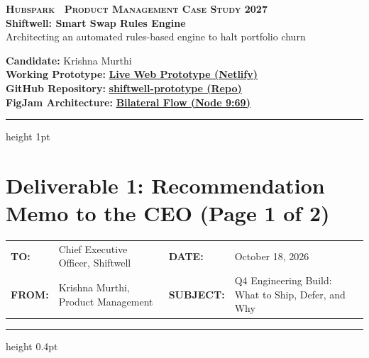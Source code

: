 \documentclass[10pt,a4paper]{article}
\begin{document}

\noindent
\begin{minipage}[t]{0.63\textwidth}
    {\scriptsize\bfseries\textsc{Hubspark \textbar\ Product Management Case Study 2027}}\\[1.5mm]
    {\LARGE\bfseries Shiftwell: Smart Swap Rules Engine}\\[1mm]
    {\small Architecting an automated rules-based engine to halt portfolio churn}
\end{minipage}
\hfill
\begin{minipage}[t]{0.35\textwidth}
    \raggedleft\footnotesize
    \textbf{Candidate:} Krishna Murthi\\[0.8mm]
    \textbf{Working Prototype:} \href{https://6ad4fc1fce522192bad9bf17--elaborate-parfait-1cc881.netlify.app/}{\bfseries\color{LinkBlue}Live Web Prototype (Netlify)}\\[0.8mm]
    \textbf{GitHub Repository:} \href{https://github.com/krishnamurthi-ramesh/shiftwell-prototype}{\bfseries\color{LinkBlue}shiftwell-prototype (Repo)}\\[0.8mm]
    \textbf{FigJam Architecture:} \href{https://www.figma.com/board/OJXSOr8Sc4iL8QuREGRVgK/Bilateral-Swap-Policy-Engine-Flow?node-id=9-69}{\bfseries\color{LinkBlue}Bilateral Flow (Node 9:69)}
\end{minipage}

\vspace{2mm}
\hrule height 1pt
\vspace{2.5mm}

\section*{Deliverable 1: Recommendation Memo to the CEO (Page 1 of 2)}

\vspace{1mm}
\noindent
\begin{tabularx}{\textwidth}{@{}lXl>{\raggedright\arraybackslash}p{6.6cm}@{}}
\textbf{TO:} & Chief Executive Officer, Shiftwell & \textbf{DATE:} & October 18, 2026 \\
\textbf{FROM:} & Krishna Murthi, Product Management & \textbf{SUBJECT:} & Q4 Engineering Build: What to Ship, Defer, and Why
\end{tabularx}
\vspace{1mm}
\hrule height 0.4pt
\vspace{2mm}
\end{document}
